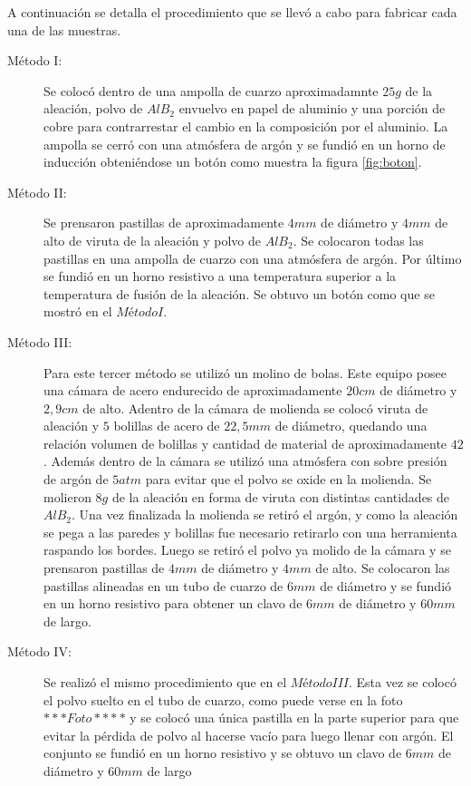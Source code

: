 \documentclass[a4paper,12pt,fleqn,twoside,openany]{book}
\begin{document}
A continuación se detalla el procedimiento que se llevó a cabo para fabricar cada una de las muestras.


\begin{description}
\item[Método I:] Se colocó dentro de una ampolla de cuarzo aproximadamnte $25 g$ de la aleación, polvo de $AlB_2$ envuelvo en papel de aluminio y una porción de 
cobre para contrarrestar el cambio en la composición por el aluminio. La ampolla se cerró con una atmósfera de argón y se fundió en un horno de inducción obteniéndose un botón como muestra la figura \ref{fig:boton}.

\item[Método II:] Se prensaron pastillas de aproximadamente $4 mm$ de diámetro y $4 mm$ de alto de viruta de la aleación y polvo de $AlB_2$. Se 
colocaron todas las pastillas en una ampolla de cuarzo con una atmósfera de argón. Por último se fundió en un horno resistivo a una temperatura superior 
a la temperatura de fusión de la aleación. Se obtuvo un botón como que se mostró en el $Método I$.

\item[Método III:] Para este tercer método se utilizó un molino de bolas. Este equipo posee una cámara de acero endurecido de aproximadamente $20 cm$ de diámetro y $2,9 cm$ de alto. Adentro de la cámara de molienda se colocó viruta de aleación y $5$ bolillas de acero de $22,5 mm$ de diámetro, quedando una relación volumen de bolillas y cantidad de material de aproximadamente $42$. Además dentro de la cámara se utilizó una atmósfera con sobre presión de argón de $5 atm$ para evitar que el polvo se oxide en la molienda.
Se molieron $8g$ de la aleación en forma de viruta con distintas cantidades de $AlB_2$.  Una vez finalizada la molienda se retiró el argón, y 
como la aleación se pega a las paredes y bolillas fue necesario retirarlo con una herramienta raspando los bordes.
Luego se retiró el polvo ya molido de la cámara y se prensaron pastillas de $4mm$ de diámetro y $4mm$ de alto. Se colocaron las pastillas alineadas en un tubo de cuarzo de $6 mm$ de diámetro y se fundió en un horno resistivo para obtener un clavo de $6 mm$ de diámetro y $60 mm$ de largo.

\item[Método IV:] Se realizó el mismo procedimiento que en el $Método III$. Esta vez se colocó el polvo suelto en el tubo de cuarzo, como puede verse en la foto $***Foto****$ y se colocó una única pastilla en la parte superior para que evitar la pérdida de polvo al hacerse vacío para luego llenar con argón. El conjunto se fundió en un horno resistivo y se obtuvo un clavo de $6 mm$ de diámetro y $60 mm$ de largo 
\end{description}
\end{document}
